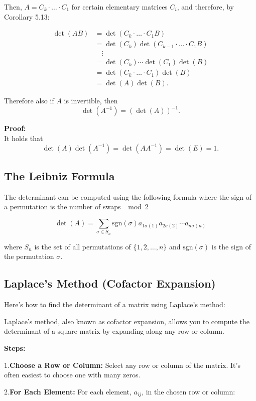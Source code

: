Then, \( A = C_k \cdot \ldots \cdot C_1 \) for certain elementary matrices \( C_i \), and therefore, by Corollary 5.13:

\begin{align*}
\det(AB) &= \det(C_k \cdot \ldots \cdot C_1 B) \\
&= \det(C_k)\det(C_{k-1} \cdot \ldots \cdot C_1 B) \\
&\quad \vdots \\
&= \det(C_k) \cdots \det(C_1)\det(B) \\
&= \det(C_k \cdot \ldots \cdot C_1)\det(B) \\
&= \det(A)\det(B).
\end{align*}

Therefore also if \( A \) is invertible, then
\[
\det(A^{-1}) = (\det(A))^{-1}.
\]

\textbf{Proof:} \\
It holds that
\[
\det(A)\det(A^{-1}) = \det(AA^{-1}) = \det(E) = 1.
\]

\subsection{The Leibniz Formula}

The determinant can be computed using the following formula where the sign
of a permutation is the number of swaps \(\mod 2\)

\[
\det(A) = \sum_{\sigma \in S_n} \text{sgn}(\sigma) a_{1\sigma(1)} a_{2\sigma(2)} \cdots a_{n\sigma(n)}
\]
    
where \(S_n\) is the set of all permutations of \(\{1, 2, \dots, n\}\) and \(\text{sgn}(\sigma)\) is the sign of the permutation \(\sigma\). 

\subsection{Laplace's Method (Cofactor Expansion)}

Here's how to find the determinant of a matrix using Laplace's method:

Laplace's method, also known as cofactor expansion, allows you to compute the determinant of a square matrix by expanding along any row or column.

\textbf{Steps:}

1.\textbf{Choose a Row or Column:} Select any row or column of the matrix.  It's often easiest to choose one with many zeros.

 2.\textbf{For Each Element:} For each element, \(a_{ij}\), in the chosen row or column:

